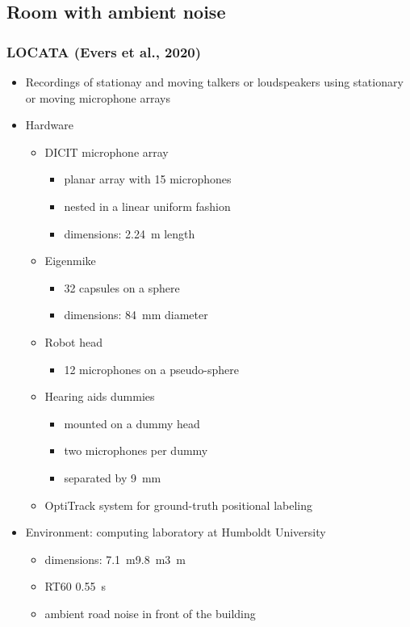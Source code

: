 \documentclass[14pt, legalpaper]{extarticle}
\begin{document}
\subsection{Room with ambient noise}

\subsubsection{LOCATA (Evers et al., 2020)}

\begin{itemize}

\item Recordings of stationay and moving talkers or loudspeakers using stationary or moving microphone arrays \cite{evers2020data}

\item Hardware
	\begin{itemize}
	\item DICIT microphone array \cite{brutti2010woz}
		\begin{itemize}
		\item planar array with 15 microphones 
		\item nested in a linear uniform fashion	
		\item dimensions: \SI{2.24}{\metre} length
		\end{itemize}
	\item Eigenmike
		\begin{itemize}
		\item 32 capsules on a sphere 
		\item dimensions: \SI{84}{\milli\metre} diameter
		\end{itemize}
	\item Robot head
		\begin{itemize}
		\item 12 microphones on a pseudo-sphere 
		\end{itemize}
	\item Hearing aids dummies
		\begin{itemize}
		\item mounted on a dummy head
		\item two microphones per dummy
		\item separated by \SI{9}{\milli\metre}
		\end{itemize}
	\item OptiTrack system for ground-truth positional labeling
	\end{itemize}

\item Environment: computing laboratory at Humboldt University
	\begin{itemize}
	\item dimensions: \SI{7.1}{\metre}\texttimes\SI{9.8}{\metre}\texttimes\SI{3}{\metre}
	\item RT60 \SI{0.55}{\second} 
	\item ambient road noise in front of the building
	\end{itemize}


\end{itemize}
\end{document}
